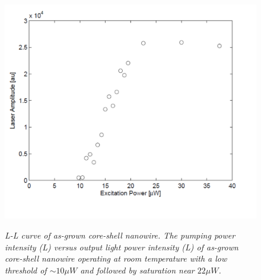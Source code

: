 \begin{figure}
  \caption{\em{L-L curve of as-grown core-shell nanowire.} The pumping power intensity (L) versus output light power intensity (L) of as-grown core-shell nanowire operating at room temperature with a low threshold of $\sim10{\mu}W$ and followed by saturation near $22{\mu}W$.}
  \centering
  \includegraphics[width=\textwidth]{pictures/Data/expthreshold}
  \label{expthreshold}
\end{figure}

